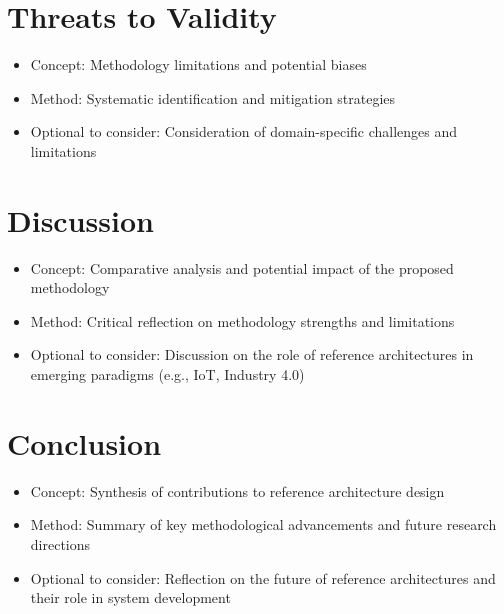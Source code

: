 \documentclass[12pt,a4paper]{article}
\begin{document}
\section{Threats to Validity}
\begin{itemize}
    \item Concept: Methodology limitations and potential biases
    \item Method: Systematic identification and mitigation strategies \citep{Wohlin2012}
    \item Optional to consider: Consideration of domain-specific challenges and limitations \citep{Nakagawa2023}
\end{itemize}

\section{Discussion}
\begin{itemize}
    \item Concept: Comparative analysis and potential impact of the proposed methodology
    \item Method: Critical reflection on methodology strengths and limitations
    \item Optional to consider: Discussion on the role of reference architectures in emerging paradigms (e.g., IoT, Industry 4.0) \citep{Nakagawa2023}
\end{itemize}

\section{Conclusion}
\begin{itemize}
    \item Concept: Synthesis of contributions to reference architecture design
    \item Method: Summary of key methodological advancements and future research directions
    \item Optional to consider: Reflection on the future of reference architectures and their role in system development \citep{Nakagawa2023}
\end{itemize}



\end{document}
